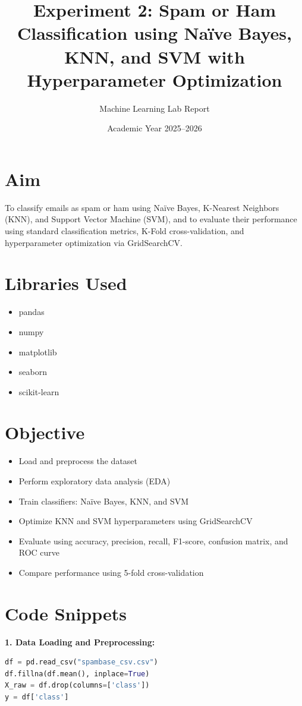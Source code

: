 \documentclass[12pt]{article}
\title{\textbf{Experiment 2: Spam or Ham Classification using Na\"ive Bayes, KNN, and SVM with Hyperparameter Optimization}}
\author{Machine Learning Lab Report}
\date{Academic Year 2025--2026}
\begin{document}
\maketitle

\section*{Aim}
To classify emails as spam or ham using Na\"ive Bayes, K-Nearest Neighbors (KNN), and Support Vector Machine (SVM), and to evaluate their performance using standard classification metrics, K-Fold cross-validation, and hyperparameter optimization via GridSearchCV.

\section*{Libraries Used}
\begin{itemize}
\item pandas
\item numpy
\item matplotlib
\item seaborn
\item scikit-learn
\end{itemize}

\section*{Objective}
\begin{itemize}
\item Load and preprocess the dataset
\item Perform exploratory data analysis (EDA)
\item Train classifiers: Na\"ive Bayes, KNN, and SVM
\item Optimize KNN and SVM hyperparameters using GridSearchCV
\item Evaluate using accuracy, precision, recall, F1-score, confusion matrix, and ROC curve
\item Compare performance using 5-fold cross-validation
\end{itemize}

\section*{Code Snippets}
\textbf{1. Data Loading and Preprocessing:}
\begin{lstlisting}[language=Python]
df = pd.read_csv("spambase_csv.csv")
df.fillna(df.mean(), inplace=True)
X_raw = df.drop(columns=['class'])
y = df['class']
\end{lstlisting}
\end{document}
